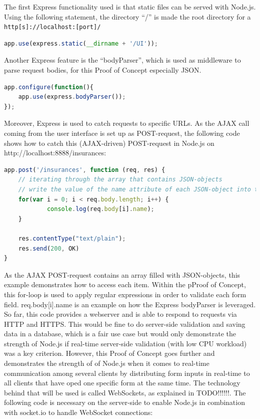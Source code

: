 The first Express functionality used is that static files can be served with
Node.js. Using the following statement, the directory “/” is made the root
directory for a \texttt{http[s]://localhost:[port]/}

\begin{lstlisting}[language=javascript,caption={Serving static assets with Express}]
app.use(express.static(__dirname + '/UI'));
\end{lstlisting}

Another Express feature is the “bodyParser”, which is used as middleware to
parse request bodies, for this Proof of Concept especially JSON.

\begin{lstlisting}[language=javascript,caption={Using the bodyParser}]
app.configure(function(){
    app.use(express.bodyParser());
});
\end{lstlisting}

Moreover, Express is used to catch requests to specific URLs. As the AJAX call coming from the user interface is set up as POST-request, the following code shows how to catch this (AJAX-driven) POST-request in Node.js on http://localhost:8888/insurances:

\begin{lstlisting}[language=javascript,caption={Iteration through an array consisting of JSON data}]
app.post('/insurances', function (req, res) {
	// iterating through the array that contains JSON-objects
	// write the value of the name attribute of each JSON-object into the console
	for(var i = 0; i < req.body.length; i++) {
        	console.log(req.body[i].name);
	}

	res.contentType("text/plain");
	res.send(200, OK)
}
\end{lstlisting}

As the AJAX POST-request contains an array filled with JSON-objects, this
example demonstrates how to access each item. Within the pProof of Concept, this
for-loop is used to apply regular expressions in order to validate each form
field. req.body[i].name is an example on how the Express bodyParser is leveraged.\\

So far, this code provides a webserver and is able to respond to requests via HTTP and HTTPS. This would be fine to do server-side validation and saving data in a database, which is a fair use case but would only demonstrate the strength of Node.js if real-time server-side validation (with low CPU workload) was a key criterion. However, this Proof of Concept goes further and demonstrates the strength of of Node.js when it comes to real-time communication among several clients by distributing form inputs in real-time to all clients that have oped one specific form at the same time. The technology behind that will be used is called WebSockets, as explained in TODO!!!!!!. The following code is necessary on the server-side to enable Node.js in combination with socket.io to handle WebSocket connections:

